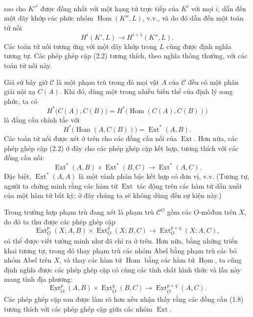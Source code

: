 \documentclass[11pt,twoside,openany]{book}
\numberwithin{equation}{section}
\newcommand{\src}[1]{%
  \phantomsection\hypertarget{src:\fgasourceid:#1}{}%
  \marginpar{\raggedleft\footnotesize\sffamily #1}%
}
\newcommand{\fgasourceid}{unset}
\newcommand{\Osh}{\underline{O}}
\newcommand{\Ccat}{\mathcal C}
\newcommand{\Homsh}{\underline{\operatorname{Hom}}}
\newcommand{\Extsh}{\underline{\operatorname{Ext}}}
\newcommand{\fquote}[1]{\textquotedbl#1\textquotedbl}
\begin{document}
\src{172}
sao cho $K'^{i}$ được đồng nhất với một hạng tử trực tiếp của $K^{i}$ với mọi $i$,
dẫn đến một dãy khớp các phức nhóm $\operatorname{Hom}(K'',L)$, v.v., và do đó dẫn đến một
toán tử nối
\[
  H^{i}(K',L)\longrightarrow H^{i+1}(K'',L).
\]
Các toán tử nối tương ứng với một dãy khớp trong $L$ cũng được định nghĩa tương tự. Các
phép ghép cặp (2.2) tương thích, theo nghĩa thông thường, với các toán tử nối này.

Giả sử bây giờ $\Ccat$ là một phạm trù trong đó mọi vật $A$ của $\Ccat$
đều có một phân giải nội xạ $C(A)$. Khi đó, dùng một trong nhiều biến thể của định lý song phức, ta có
\[
  H^{*}\bigl(C(A),C(B)\bigr)
  =H^{*}\bigl(\operatorname{Hom}(C(A),C(B))\bigr)
\]
là đẳng cấu chính tắc với
\[
  H^{*}\bigl(\operatorname{Hom}(A,C(B))\bigr)
  =\operatorname{Ext}^{*}(A,B).
\]
Các toán tử nối được xét ở trên cho các đồng cấu nối của
$\operatorname{Ext}$. Hơn nữa, các phép ghép cặp (2.2) ở đây cho
các phép ghép cặp kết hợp, tương thích với các đồng cấu nối:
\begin{equation}\tag{2.3}
  \operatorname{Ext}^{*}(A,B)\times\operatorname{Ext}^{*}(B,C)
  \longrightarrow\operatorname{Ext}^{*}(A,C).
\end{equation}
Đặc biệt, $\operatorname{Ext}^{*}(A,A)$ là một vành phân bậc kết hợp
có đơn vị, v.v. (Tương tự, người ta chứng minh rằng các hàm tử
$\operatorname{Ext}$ tác động trên các hàm tử dẫn xuất của một hàm tử
bất kỳ; ở đây chúng ta sẽ không dùng đến sự kiện này.)

Trong trường hợp phạm trù đang xét là phạm trù $\Ccat^{\Osh}$ gồm các
$\Osh$-môđun trên $X$, do đó ta thu được các phép ghép cặp
\begin{equation}\tag{2.4}
  \operatorname{Ext}_{\Osh}^{p}(X;A,B)
  \times\operatorname{Ext}_{\Osh}^{q}(X;B,C)
  \longrightarrow\operatorname{Ext}_{\Osh}^{p+q}(X;A,C),
\end{equation}
có thể được viết tường minh như đã chỉ ra ở trên. Hơn nữa, bằng những triển khai tương tự,
trong đó thay phạm trù các nhóm Abel bằng phạm trù các bó nhóm Abel trên $X$, và thay các hàm tử
$\operatorname{Hom}$ bằng các hàm tử $\Homsh$, ta cũng định nghĩa được các phép ghép cặp có cùng
các tính chất hình thức và lần này mang \fquote{tính địa phương}:
\begin{equation}\tag{2.5}
  \Extsh_{\Osh}^{p}(A,B)\times\Extsh_{\Osh}^{q}(B,C)
  \longrightarrow\Extsh_{\Osh}^{p+q}(A,C).
\end{equation}
Các phép ghép cặp sau được làm rõ hơn nếu nhận thấy rằng các đồng cấu (1.8) tương thích
với các phép ghép cặp giữa các nhóm $\operatorname{Ext}$.
\end{document}
